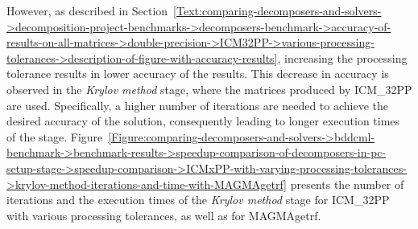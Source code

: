 However, as described in Section~\ref{Text:comparing-decomposers-and-solvers->decomposition-project-benchmarks->decomposers-benchmark->accuracy-of-results-on-all-matrices->double-precision->ICM32PP->various-processing-tolerances->description-of-figure-with-accuracy-results}, increasing the processing tolerance results in lower accuracy of the results. This decrease in accuracy is observed in the \textit{Krylov method} stage, where the matrices produced by ICM\_32PP are used. Specifically, a higher number of iterations are needed to achieve the desired accuracy of the solution, consequently leading to longer execution times of the stage. Figure~\ref{Figure:comparing-decomposers-and-solvers->bddcml-benchmark->benchmark-results->speedup-comparison-of-decomposers-in-pc-setup-stage->speedup-comparison->ICMxPP-with-varying-processing-tolerances->krylov-method-iterations-and-time-with-MAGMAgetrf} presents the number of iterations and the execution times of the \textit{Krylov method} stage for ICM\_32PP with various processing tolerances, as well as for MAGMAgetrf.

